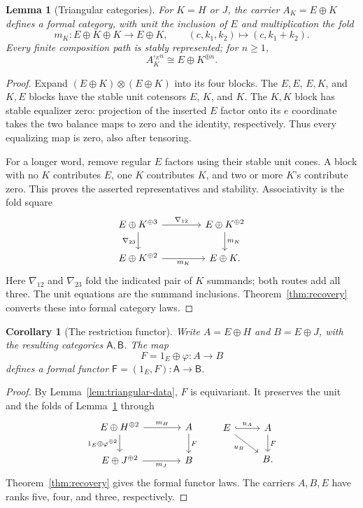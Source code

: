 \documentclass[11pt,a4paper]{article}
\newtheorem{lemma}[theorem]{Lemma}
\newtheorem{corollary}[theorem]{Corollary}
\theoremstyle{definition}
\theoremstyle{remark}
\numberwithin{equation}{section}
\begin{document}
\begin{lemma}[Triangular categories]\label{lem:triangular}
For $K=H$ or $J$, the carrier $A_K=E\oplus K$ defines a formal category,
with unit the inclusion of $E$ and multiplication the fold
\[
m_K:E\oplus K\oplus K\longrightarrow E\oplus K,\qquad
(c,k_1,k_2)\longmapsto(c,k_1+k_2).
\]
Every finite composition path is stably represented; for $n\geq1$,
\[
A_K^{\square_E n}\cong E\oplus K^{\oplus n}.
\]
\end{lemma}
\begin{proof}
Expand $(E\oplus K)\otimes(E\oplus K)$ into its four blocks.
The $E,E$, $E,K$, and $K,E$ blocks have the stable unit cotensors
$E$, $K$, and $K$. The $K,K$ block has stable equalizer zero:
projection of the inserted $E$ factor onto its $e$ coordinate takes
the two balance maps to zero and the identity, respectively. Thus every
equalizing map is zero, also after tensoring.

For a longer word, remove regular $E$ factors using their stable unit
cones. A block with no $K$ contributes $E$, one $K$ contributes $K$,
and two or more $K$'s contribute zero. This proves the asserted
representatives and stability. Associativity is the fold square
\[
\begin{tikzcd}[column sep=4em]
E\oplus K^{\oplus3} \arrow[r,"\nabla_{12}"]
  \arrow[d,"\nabla_{23}"'] &
E\oplus K^{\oplus2} \arrow[d,"m_K"]\\
E\oplus K^{\oplus2} \arrow[r,"m_K"'] & E\oplus K.
\end{tikzcd}
\]
Here $\nabla_{12}$ and $\nabla_{23}$ fold the indicated pair of $K$
summands; both routes add all three. The unit
equations are the summand inclusions. Theorem~\ref{thm:recovery}
converts these into formal category laws.
\end{proof}

\begin{corollary}[The restriction functor]\label{cor:triangular-functor}
Write $A=E\oplus H$ and $B=E\oplus J$, with the resulting categories
$\mathsf A,\mathsf B$. The map
\[
F=1_E\oplus\varphi:A\longrightarrow B
\]
defines a formal functor $\mathsf F=(1_E,F):\mathsf A\to\mathsf B$.
\end{corollary}
\begin{proof}
By Lemma~\ref{lem:triangular-data}, $F$ is equivariant. It preserves
the unit and the folds of Lemma~\ref{lem:triangular} through
\[
\begin{tikzcd}[column sep=3.8em]
E\oplus H^{\oplus2} \arrow[r,"m_H"]
  \arrow[d,"1_E\oplus\varphi^{\oplus2}"'] &
A \arrow[d,"F"]\\
E\oplus J^{\oplus2} \arrow[r,"m_J"'] & B
\end{tikzcd}
\qquad
\begin{tikzcd}
E \arrow[r,hook,"u_A"] \arrow[dr,"u_B"'] &
A \arrow[d,"F"]\\
& B.
\end{tikzcd}
\]
Theorem~\ref{thm:recovery} gives the formal functor laws.
The carriers $A,B,E$ have ranks five, four, and three, respectively.
\end{proof}
\end{document}
